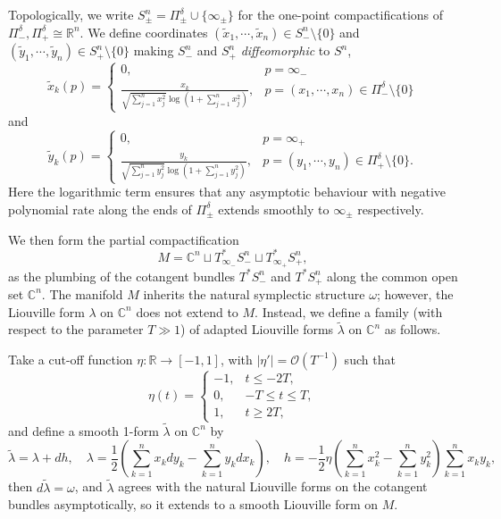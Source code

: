 \documentclass[11pt,a4paper]{article}
\numberwithin{equation}{section}%
\theoremstyle{definition}
\newcommand{\R}{\mathbb{R}}
\newcommand{\C}{\mathbb{C}}
\begin{document}
    Topologically, we write $S_\pm^n=\Pi_\pm^\delta\cup \{\infty_\pm\}$ for the one-point compactifications of $\Pi_-^\delta,\Pi_+^\delta \cong \R^n$. We define coordinates $(\tilde x_1,\cdots ,\tilde x_n)\in S_{-}^n\setminus\{0\}$ and $(\tilde y_1,\cdots ,\tilde y_n)\in S_{+}^n\setminus\{0\}$ making $S_-^n$ and $S_+^n$ \textit{diffeomorphic} to $S^n$, 
    \begin{equation*}
        \tilde x_k(p)=\left\{\begin{array}{ll}
           0,  &  p=\infty_-\\
           \frac{x_k}{\sqrt{\sum\limits_{j=1}^n x_j^2}\log\left(1+\sum\limits_{j=1}^n x_j^2\right)},  & p=(x_1,\cdots,x_n)\in \Pi_-^\delta\setminus\{0\}
        \end{array}\right.
    \end{equation*}
    and 
    \begin{equation*}
        \tilde y_k(p)=\left\{\begin{array}{ll}
           0,  &  p=\infty_+\\
           \frac{y_k}{\sqrt{\sum\limits_{j=1}^n y_j^2}\log\left(1+\sum\limits_{j=1}^n y_j^2\right)},  & p=(y_1,\cdots,y_n)\in \Pi_+^\delta\setminus\{0\}.
        \end{array}\right.
    \end{equation*}
    Here the logarithmic term ensures that any asymptotic behaviour with negative polynomial rate along the ends of $\Pi_\pm^\delta$ extends smoothly to $\infty_\pm$ respectively.

    We then form the partial compactification \[
M= \C^n \sqcup T^*_{\infty_-} S_-^n\sqcup T^*_{\infty_+} S_+^n,
\]
as the plumbing of the cotangent bundles $T^*S_-^n$ and $T^* S_+^n$ along the common open set $\C^n$. The manifold $M$ inherits the natural symplectic structure $\omega$; however, the Liouville form $\lambda$ on $\C^n$ does not extend to $M$. Instead, we define a family (with respect to the parameter $T\gg 1$) of adapted Liouville forms $\tilde \lambda$ on $\C^n$ as follows.   

Take a cut-off function $\eta:\R\to [-1,1]$, with $|\eta'|=\mathcal{O}(T^{-1})$ such that $$\eta(t)=\left\{\begin{array}{ll}
     -1,& t\leqslant -2T, \\
     0, & -T\leqslant t\leqslant T,\\
     1,
&t\geqslant 2T,\end{array}\right.$$ and 
define a smooth 1-form
$\widetilde{\lambda}$ on $\C^n$ by
$$
\widetilde{\lambda}=\lambda+dh,\quad \lambda= \frac{1}{2} \left(\sum_{k=1}^n x_kdy_k-\sum_{k=1}^n y_kdx_k\right),\quad h= -\frac{1}{2} \eta\left( \sum_{k=1}^n x_k^2-\sum_{k=1}^n y_k^2   \right)\sum_{k=1}^n x_ky_k,
$$
then $d\widetilde{\lambda}=\omega$, and $\widetilde{\lambda}$ agrees with the natural Liouville forms on the cotangent bundles asymptotically, so it extends to a smooth Liouville form on $M$. 
\end{document}
